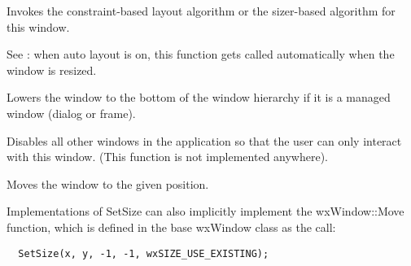 \label{wxwindowlayout}


Invokes the constraint-based layout algorithm or the sizer-based algorithm
for this window.

See : when auto
layout is on, this function gets called automatically when the window is resized.

\label{wxwindowlower}


Lowers the window to the bottom of the window hierarchy if it is a managed window (dialog
or frame).

\label{wxwindowmakemodal}


Disables all other windows in the application so that
the user can only interact with this window. (This function
is not implemented anywhere).



\label{wxwindowmove}



Moves the window to the given position.






Implementations of SetSize can also implicitly implement the
wxWindow::Move function, which is defined in the base wxWindow class
as the call:

\begin{verbatim}
  SetSize(x, y, -1, -1, wxSIZE_USE_EXISTING);
\end{verbatim}


